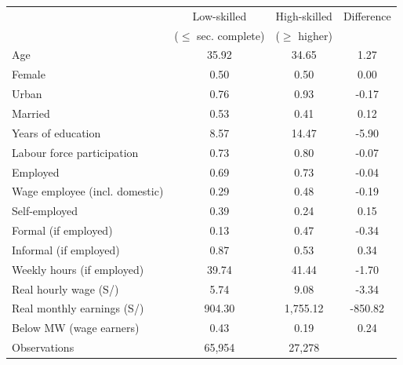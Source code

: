 \begin{tabular}{lccc}
\toprule
 & Low-skilled & High-skilled & Difference \\
 & ($\le$ sec. complete) & ($\ge$ higher) & \\
\midrule
Age & 35.92 & 34.65 & 1.27 \\
Female & 0.50 & 0.50 & 0.00 \\
Urban & 0.76 & 0.93 & -0.17 \\
Married & 0.53 & 0.41 & 0.12 \\
Years of education & 8.57 & 14.47 & -5.90 \\
Labour force participation & 0.73 & 0.80 & -0.07 \\
Employed & 0.69 & 0.73 & -0.04 \\
Wage employee (incl. domestic) & 0.29 & 0.48 & -0.19 \\
Self-employed & 0.39 & 0.24 & 0.15 \\
Formal (if employed) & 0.13 & 0.47 & -0.34 \\
Informal (if employed) & 0.87 & 0.53 & 0.34 \\
Weekly hours (if employed) & 39.74 & 41.44 & -1.70 \\
Real hourly wage (S/) & 5.74 & 9.08 & -3.34 \\
Real monthly earnings (S/) & 904.30 & 1,755.12 & -850.82 \\
Below MW (wage earners) & 0.43 & 0.19 & 0.24 \\
\midrule
Observations & 65,954 & 27,278 & \\
\bottomrule
\end{tabular}
